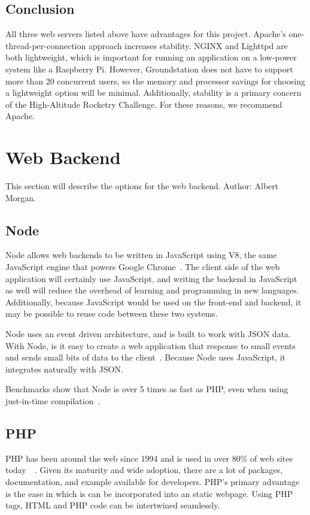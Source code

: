 \documentclass[10pt,draftclsnofoot,onecolumn]{IEEEtran}
\begin{document}
	\subsection{Conclusion}
	All three web servers listed above have advantages for this project.
	Apache's one-thread-per-connection approach increases stability.
	NGINX and Lighttpd are both lightweight, which is important for running an application on a low-power system like a Raspberry Pi.
	However, Groundstation does not have to support more than 20 concurrent users, so the memory and processor savings for choosing a lightweight option will be minimal.
	Additionally, stability is a primary concern of the High-Altitude Rocketry Challenge.
	For these reasons, we recommend Apache.


	\section{Web Backend}
	This section will describe the options for the web backend. Author: Albert Morgan.
	
	\subsection{Node}
	Node allows web backends to be written in JavaScript using V8, the same JavaScript engine that powers Google Chrome~\cite{node}.
	The client side of the web application will certainly use JavaScript, and writing the backend  in JavaScript as well will reduce the overhead of learning and programming in new languages.
	Additionally, because JavaScript would be used on the front-end and backend, it may be possible to reuse code between these two systems.
	
	Node uses an event driven architecture, and is built to work with \ac{JSON} data.
	With Node, is it easy to create a web application that response to small events and sends small bits of data to the client~\cite{event-driven-architecture-node-js}.
	Because Node uses JavaScript, it integrates naturally with \ac{JSON}.
		
	Benchmarks show that Node is over 5 times as fast as PHP, even when using just-in-time compilation~\cite{comparing-node-vs-php-performance}.
	
	\subsection{PHP}
	PHP has been around the web since 1994 and is used in over 80\% of web sites today~\cite{history-of-php}~\cite{usage-of-server-side-programming-languages-for-websites}.
	Given its maturity and wide adoption, there are a lot of packages, documentation, and example available for developers.
	PHP's primary advantage is the ease in which is can be incorporated into an static webpage.
	Using PHP tags, HTML and PHP code can be intertwined seamlessly.
	
\end{document}
